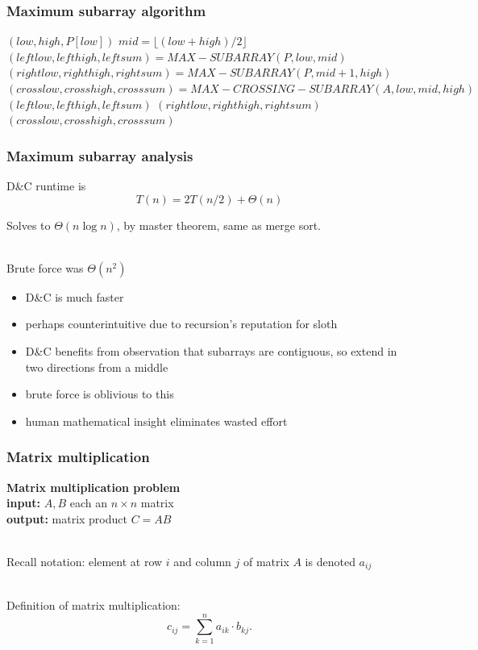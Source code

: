 \documentclass[10pt,aspectratio=169]{beamer}
\newcommand{\stanza}{ \\~\ }
\begin{document}
\begin{frame} \frametitle{Maximum subarray algorithm}
  {\tiny
  \begin{algorithmic}[1]
      \State \Return $(low, high, P[low])$
    \Else
      \State $mid = \lfloor (low+high)/2 \rfloor$
      \State $(leftlow, lefthigh, leftsum) = MAX-SUBARRAY(P, low, mid)$
      \State $(rightlow, righthigh, rightsum) = MAX-SUBARRAY(P, mid+1, high)$
      \State $(crosslow, crosshigh, crosssum) = MAX-CROSSING-SUBARRAY(A, low, mid, high)$
        \State \Return $(leftlow, lefthigh, leftsum)$ 
        \State \Return $(rightlow, righthigh, rightsum)$ 
      \Else
        \State \Return $(crosslow, crosshigh, crosssum)$ 
      \EndIf
    \EndIf
    \EndFunction
  \end{algorithmic}
  }
\end{frame}

\begin{frame} \frametitle{Maximum subarray analysis}
  D\&C runtime is \[ T(n) = 2 T(n/2) + \Theta(n) \]

  Solves to $\Theta(n \log n)$, by master theorem, same as merge sort. \stanza

  Brute force was $\Theta(n^2)$
  \begin{itemize}
    \item D\&C is much faster
    \item perhaps counterintuitive due to recursion's reputation for sloth
    \item D\&C benefits from observation that subarrays are contiguous, so
      extend in two directions from a middle
    \item brute force is oblivious to this
    \item human mathematical insight eliminates wasted effort
  \end{itemize}
\end{frame}

\begin{frame} \frametitle{Matrix multiplication}
  \textbf{Matrix multiplication problem} \\
  \textbf{input: } $A, B$ each an $n \times n$ matrix \\
  \textbf{output: } matrix product $C = AB$ \stanza

  Recall notation: element at row $i$ and column $j$ of matrix $A$ is
  denoted $a_{ij}$ \stanza

  Definition of matrix multiplication:
  \[ c_{ij} = \sum_{k=1}^n a_{ik} \cdot b_{kj} . \]
\end{frame}
\end{document}

